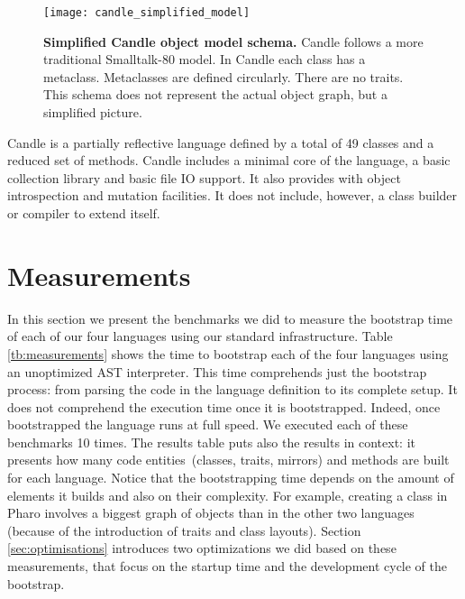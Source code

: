 \begin{figure}[ht]
\center
\texttt{[image: candle\_simplified\_model]}
\caption{\textbf{Simplified Candle object model schema.} Candle follows a more traditional Smalltalk-80 model. In Candle each class has a metaclass. Metaclasses are defined circularly. There are no traits. This schema does not represent the actual object graph, but a simplified picture.\label{fig:candle_simplified_model}}
\end{figure}


Candle is a partially reflective language defined by a total of 49 classes and a reduced set of methods. Candle includes a minimal core of the language, a basic collection library and basic file IO support. It also provides with object introspection and mutation facilities. It does not include, however, a class builder or compiler to extend itself.%

\section{Measurements}\label{sec:bootstrap_measurements}

In this section we present the benchmarks we did to measure the bootstrap time of each of our four languages using our standard infrastructure. Table \ref{tb:measurements} shows the time to bootstrap each of the four languages using an unoptimized AST interpreter. This time comprehends just the bootstrap process: from parsing the code in the language definition to its complete setup. It does not comprehend the execution time once it is bootstrapped. Indeed, once bootstrapped the language runs at full \VM speed. We executed each of these benchmarks 10 times. The results table puts also the results in context: it presents how many code entities~(classes, traits, mirrors) and methods are built for each language. Notice that the bootstrapping time depends on the amount of elements it builds and also on their complexity. For example, creating a class in Pharo involves a biggest graph of objects than in the other two languages (because of the introduction of traits and class layouts). Section \ref{sec:optimisations} introduces two optimizations we did based on these measurements, that focus on the startup time and the development cycle of the bootstrap. 

